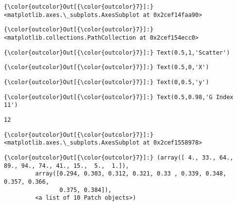 \documentclass[11pt]{article}
\begin{document}
\begin{Verbatim}[commandchars=\\\{\}]
{\color{outcolor}Out[{\color{outcolor}7}]:} <matplotlib.axes.\_subplots.AxesSubplot at 0x2cef14faa90>
\end{Verbatim}
            
\begin{Verbatim}[commandchars=\\\{\}]
{\color{outcolor}Out[{\color{outcolor}7}]:} <matplotlib.collections.PathCollection at 0x2cef154ecc0>
\end{Verbatim}
            
\begin{Verbatim}[commandchars=\\\{\}]
{\color{outcolor}Out[{\color{outcolor}7}]:} Text(0.5,1,'Scatter')
\end{Verbatim}
            
\begin{Verbatim}[commandchars=\\\{\}]
{\color{outcolor}Out[{\color{outcolor}7}]:} Text(0.5,0,'X')
\end{Verbatim}
            
\begin{Verbatim}[commandchars=\\\{\}]
{\color{outcolor}Out[{\color{outcolor}7}]:} Text(0,0.5,'y')
\end{Verbatim}
            
\begin{Verbatim}[commandchars=\\\{\}]
{\color{outcolor}Out[{\color{outcolor}7}]:} Text(0.5,0.98,'G Index 11')
\end{Verbatim}
            
    \begin{Verbatim}[commandchars=\\\{\}]
12

    \end{Verbatim}

\begin{Verbatim}[commandchars=\\\{\}]
{\color{outcolor}Out[{\color{outcolor}7}]:} <matplotlib.axes.\_subplots.AxesSubplot at 0x2cef1558978>
\end{Verbatim}
            
\begin{Verbatim}[commandchars=\\\{\}]
{\color{outcolor}Out[{\color{outcolor}7}]:} (array([ 4., 33., 64., 89., 94., 74., 41., 15.,  5.,  1.]),
         array([0.294, 0.303, 0.312, 0.321, 0.33 , 0.339, 0.348, 0.357, 0.366,
                0.375, 0.384]),
         <a list of 10 Patch objects>)
\end{Verbatim}
            
\end{document}
